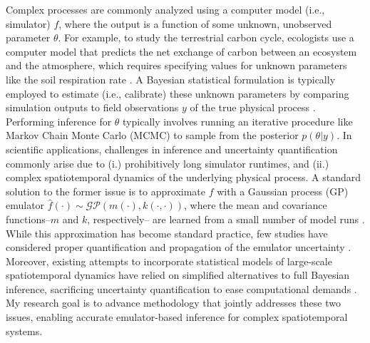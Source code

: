 \documentclass[11pt]{article}
\begin{document}
Complex processes are commonly analyzed using a computer model (i.e., simulator) $f$, where the output is a function of some unknown, unobserved parameter $\theta$.
For example, to study the terrestrial carbon cycle, ecologists use a computer model 
that predicts the net exchange of carbon between an ecosystem and the atmosphere, which requires specifying values for unknown parameters like the soil respiration rate \cite{Fer}.
A Bayesian statistical formulation is typically employed to estimate (i.e., calibrate) these unknown parameters by comparing simulation outputs to field observations $y$ of the true physical process \cite{Kennedy}. Performing inference for $\theta$ typically involves running an iterative procedure like Markov Chain Monte Carlo (MCMC) to sample from the posterior $p(\theta|y)$. In scientific applications, challenges in inference and uncertainty quantification commonly arise due to (i.) prohibitively long simulator runtimes, and (ii.) complex spatiotemporal dynamics of the underlying physical process. A standard solution to the former issue is to approximate $f$ with a Gaussian process (GP) emulator $\hat{f}(\cdot) \sim \mathcal{GP}(m(\cdot), k(\cdot, \cdot))$, where the mean and covariance functions--$m$ and $k$, respectively-- are learned from a small number of model runs \cite{Fer, Kennedy, Cleary}. While this approximation has become standard practice, few studies have considered proper quantification and propagation of the emulator uncertainty \cite{Fer, Cleary}. Moreover, existing attempts to incorporate statistical models of large-scale spatiotemporal dynamics have relied on simplified alternatives to full Bayesian inference, sacrificing uncertainty quantification to ease computational demands \cite{Sun}.
My research goal is to advance methodology that jointly addresses these two issues, enabling accurate emulator-based inference for complex spatiotemporal systems. 

\end{document}

